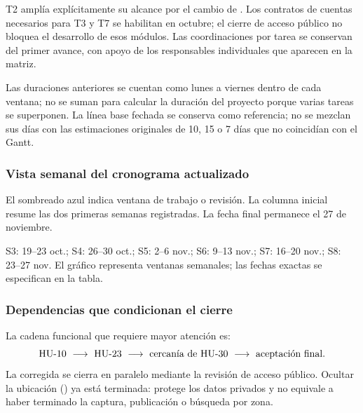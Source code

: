 T2 amplía explícitamente su alcance por el cambio de . Los contratos de
cuentas necesarios para T3 y T7 se habilitan en octubre; el cierre de acceso
público no bloquea el desarrollo de esos módulos. Las coordinaciones por
tarea se conservan del primer avance, con apoyo de los responsables
individuales que aparecen en la matriz.

Las duraciones anteriores se cuentan como lunes a viernes dentro de cada
ventana; no se suman para calcular la duración del proyecto porque varias
tareas se superponen. La línea base fechada se conserva como referencia;
no se mezclan sus días con las estimaciones originales de 10, 15 o 7 días
que no coincidían con el Gantt.

\subsubsection{Vista semanal del cronograma actualizado}
El sombreado azul indica ventana de trabajo o revisión. La columna inicial
resume las dos primeras semanas registradas. La fecha final permanece el
27 de noviembre.

\begin{center}
\end{center}
{\small S3: 19--23 oct.; S4: 26--30 oct.; S5: 2--6 nov.; S6: 9--13 nov.;
S7: 16--20 nov.; S8: 23--27 nov. El gráfico representa ventanas semanales;
las fechas exactas se especifican en la tabla.}

\subsubsection{Dependencias que condicionan el cierre}
La cadena funcional que requiere mayor atención es:
\[
\hu{10}\ \longrightarrow\ \hu{23}\ \longrightarrow\
\text{cercanía de \hu{30}}\ \longrightarrow\ \text{aceptación final}.
\]
La  corregida se cierra en paralelo mediante la revisión de acceso
público. Ocultar la ubicación (\hu{12}) ya está terminada: protege los datos
privados y no equivale a haber terminado la captura, publicación o búsqueda
por zona.

